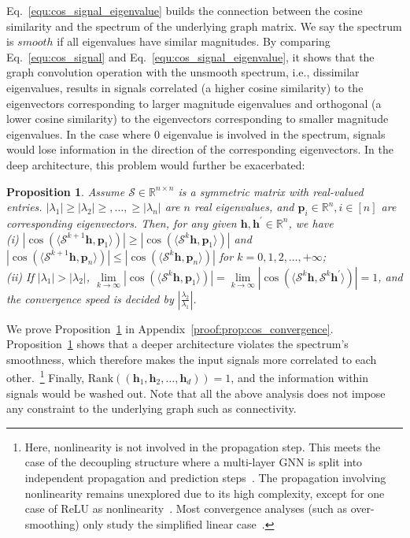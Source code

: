 \documentclass[nohyperref]{article}
\theoremstyle{plain}
\newtheorem{proposition}[theorem]{Proposition}
\theoremstyle{definition}
\theoremstyle{remark}
\begin{document}
Eq.~\ref{equ:cos_signal_eigenvalue} builds the connection between the cosine similarity and the spectrum of the underlying graph matrix.
We say the spectrum is $smooth$ if all eigenvalues have similar magnitudes.
By comparing Eq.~\ref{equ:cos_signal} and Eq.~\ref{equ:cos_signal_eigenvalue}, it shows that the graph convolution operation with the unsmooth spectrum, i.e., dissimilar eigenvalues, results in signals correlated (a higher cosine similarity) to the eigenvectors corresponding to larger magnitude eigenvalues and orthogonal (a lower cosine similarity) to the eigenvectors corresponding to smaller magnitude eigenvalues.
In the case where 0 eigenvalue is involved in the spectrum, signals would lose information in the direction of the corresponding eigenvectors.
In the deep architecture, this problem would further be exacerbated:
\begin{proposition}
	\label{prop:cos_convergence}
	Assume $ \mathcal S\in \mathbb R^{n\times n}$ is a symmetric matrix with real-valued entries. $|\lambda_1|\geq|\lambda_2|\geq,\dots,\geq|\lambda_n|$ are $n$ real eigenvalues, and $\bm p_i\in\mathbb R^n,i\in[n]$ are corresponding eigenvectors. Then, for any given $\bm h,\bm h^{\prime}\in\mathbb R^n$, we have\\
	(i) $|\cos(\langle \mathcal S^{k+1}\bm h, \bm p_1\rangle)|\geq|\cos(\langle \mathcal S^k\bm h, \bm p_1\rangle)|$ and $|\cos(\langle \mathcal S^{k+1}\bm h, \bm p_n\rangle)|\leq|\cos(\langle \mathcal S^k\bm h, \bm p_n\rangle)|$ for $k=0,1,2,\dots,+\infty$;\\
	(ii) If $|\lambda_1|>|\lambda_2|$, $\lim\limits_{k\rightarrow\infty}|\cos(\langle \mathcal S^k\bm h, \bm p_1\rangle)|=\lim\limits_{k\rightarrow\infty}|\cos(\langle \mathcal S^k\bm h, \mathcal S^k\bm h^{\prime}\rangle)|=1$, and the convergence speed is decided by $|\frac{\lambda_2}{\lambda_1}|$.
\end{proposition}
We prove Proposition~\ref{prop:cos_convergence} in Appendix~\ref{proof:prop:cos_convergence}.
Proposition~\ref{prop:cos_convergence} shows that a deeper architecture violates the spectrum's smoothness, which therefore makes the input signals more correlated to each other.~\footnote{
	Here, nonlinearity is not involved in the propagation step.
	This meets the case of the decoupling structure where a multi-layer GNN is split into independent propagation and prediction steps~\cite{liu2020towards,pmlr-v97-wu19e,klicpera_predict_2019,zhu2020simple,zhang2021litegem}.
	The propagation involving nonlinearity remains unexplored due to its high complexity, except for one case of ReLU as nonlinearity~\cite{oono2020graph}.
	Most convergence analyses (such as over-smoothing) only study the simplified linear case~\cite{cai2020graphnorm,liu2020towards,pmlr-v97-wu19e,klicpera_predict_2019,zhao2020pairnorm,xu2018representation,chenWHDL2020gcnii,zhu2020simple,klicpera2019diffusion,chien2021adaptive}.
}
Finally, $\textrm{Rank}((\bm h_1, \bm h_2, \dots, \bm h_d))=1$, and the information within signals would be washed out.
Note that all the above analysis does not impose any constraint to the underlying graph such as connectivity.
\end{document}
